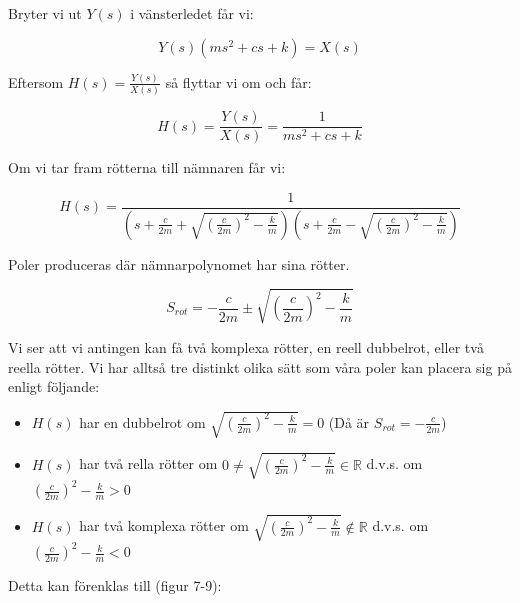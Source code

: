 \documentclass[10pt,a4paper]{article}
\begin{document}
Bryter vi ut $Y(s)$ i vänsterledet får vi:

\begin{equation}
Y(s)(m  s^2 + c  s + k) = X(s)
\end{equation}

Eftersom $H(s) = \frac{Y(s)}{X(s)}$ så flyttar vi om och får:

\begin{equation}
H(s) = \frac{Y(s)}{X(s)} = \frac{1}{m s^2 + c  s + k}
\end{equation}

Om vi tar fram rötterna till nämnaren får vi:

\begin{equation}
H(s)= \frac{1}{(s + \frac{c}{2 m} + \sqrt{ (\frac{c}{2  m})^2 - \frac{k}{m}}) (s + \frac{c}{2  m} - \sqrt{ (\frac{c}{2  m})^2 - \frac{k}{m}})}
\end{equation}

Poler produceras där nämnarpolynomet har sina rötter.

\begin{equation}
S_{rot}=-\frac{c}{2m} \pm \sqrt{(\frac{c}{2m})^2-\frac{k}{m}}
\end{equation}

Vi ser att vi antingen kan få två komplexa rötter, en reell dubbelrot, eller två reella rötter. Vi har alltså tre distinkt olika sätt som våra poler kan placera sig på enligt följande:
\begin{itemize}

\item $H(s)$ har en dubbelrot om $\sqrt{(\frac{c}{2m})^2-\frac{k}{m}}=0$ (Då är $S_{rot}=-\frac{c}{2m}$)


\item $H(s)$ har två rella rötter om $0\neq\sqrt{(\frac{c}{2m})^2-\frac{k}{m}}\in \mathbb{R}$ \newline d.v.s. om $(\frac{c}{2m})^2-\frac{k}{m}>0$


\item $H(s)$ har två komplexa rötter om $\sqrt{(\frac{c}{2m})^2-\frac{k}{m}}\notin \mathbb{R}$ \newline d.v.s. om $(\frac{c}{2m})^2-\frac{k}{m}<0$

\end{itemize}

Detta kan förenklas till (figur 7-9):
\end{document}
